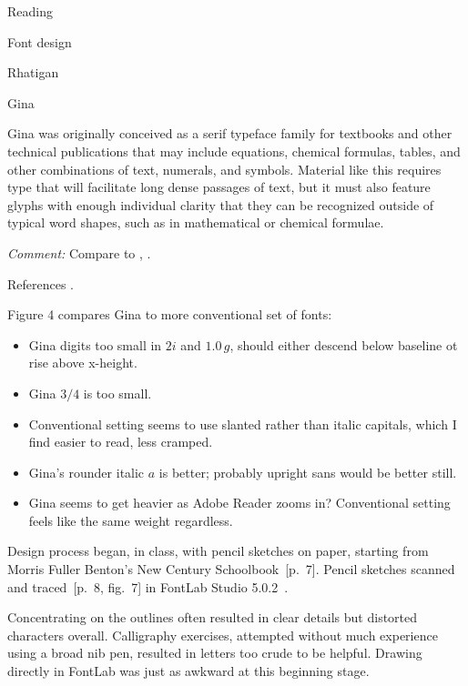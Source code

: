 \documentclass[12pt]{PalisadesLakesBook}
\begin{document}
\begin{plSection}{Reading}
\begin{plSection}{Font design}
\begin{plSection}{Rhatigan}
\begin{plSection}{Gina}
\begin{plSection}{}
\begin{plQuote}{}{}
Gina was originally conceived as a serif typeface family
for textbooks and other technical publications that may include
equations, chemical formulas, tables, and other combinations of
text, numerals, and symbols.
Material like this requires type that will facilitate long dense
passages of text, but it must also feature glyphs with enough
individual clarity that they can be recognized outside of typical
word shapes, such as in mathematical or chemical formulae.
\end{plQuote}

\emph{Comment:} 
Compare to ,
.

References .

Figure 4 compares Gina to more conventional set of fonts:
\begin{itemize}
  \item Gina digits too small in $2i$ and $1.0\,g$, 
  should either descend below baseline ot rise above x-height.
  \item Gina $3/4$ is too small.
  \item Conventional setting seems to use slanted rather 
  than italic capitals, which I find easier to read, less cramped.
  \item Gina's rounder italic $\mathit{a}$ is better; 
  probably upright sans would be better still.
  \item Gina seems to get heavier as Adobe Reader zooms in?
  Conventional setting feels like the same weight regardless. 
\end{itemize}

Design process began, in class, with pencil sketches on paper,
starting from Morris Fuller Benton's New Century 
Schoolbook~[p.~7].
Pencil sketches scanned and traced~[p.~8, fig.~7] 
in FontLab Studio 5.0.2~\cite{FontLab:2021}.

\begin{plQuote}{}{}
Concentrating on the outlines often resulted in clear details
but distorted characters overall.
Calligraphy exercises, attempted without much experience 
using a broad nib pen, resulted in letters too crude
to be helpful. Drawing directly in FontLab was just as awkward
at this beginning stage.


\end{plQuote}
\end{plSection}
\end{plSection}
\end{plSection}
\end{plSection}
\end{plSection}
\end{document}
